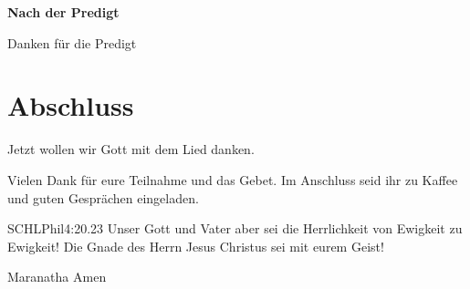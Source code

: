 \textbf{Nach der Predigt}

Danken für die Predigt

\section{Abschluss}

Jetzt wollen wir Gott mit dem Lied  danken.


Vielen Dank für eure Teilnahme und das Gebet. Im Anschluss seid ihr zu Kaffee und guten Gesprächen eingeladen.
\beten{}

\begin{bibelbox}{SCHL}{Phil}{4:20.23}
Unser Gott und Vater aber sei die Herrlichkeit von Ewigkeit zu Ewigkeit!
Die Gnade des Herrn Jesus Christus sei mit eurem Geist!
\end{bibelbox}

Maranatha Amen
